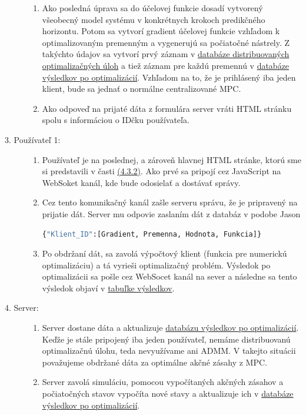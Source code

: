 \begin{description}
{\begin{enumerate}
{		}
		\item{
			 Ako posledná úprava sa do účelovej funkcie dosadí vytvorený všeobecný model systému v konkrétnych krokoch predikčného horizontu. Potom sa vytvorí gradient účelovej funkcie vzhľadom k optimalizovaným premenným a vygenerujú sa počiatočné nástrely. Z takýchto údajov sa vytvorí prvý záznam v \hyperref[DB:WORKER]{databáze distribuovaných optimalizačných úloh} a tiež záznam pre každú premennú v \hyperref[DB:WORKER_DATA]{databáze výsledkov po optimalizácií}. Vzhľadom na to, že je prihlásený iba jeden klient, bude sa jednať o normálne centralizované MPC.
		}
		\item{
			Ako odpoveď na prijaté dáta z formulára server vráti HTML stránku spolu s informáciou o IDčku používateľa.
		}
	\end{enumerate}
}
\item[3. Používateľ 1:]{\hfill
\begin{enumerate}
\item{
Používateľ je na poslednej, a zároveň hlavnej HTML stránke, ktorú sme si predstavili v časti \hyperref[subse:OPTaSIM]{(4.3.2)}. Ako prvé sa pripojí cez JavaScript na WebSoket kanál, kde bude odosielať a dostávať správy.
}
\item{
Cez tento komunikačný kanál zašle serveru správu, že je pripravený na prijatie dát. Server mu odpovie zaslaním dát z databáz v podobe Jason
\begin{lstlisting}[language=Python]
{"Klient_ID":[Gradient, Premenna, Hodnota, Funkcia]}
\end{lstlisting}
}
\item{Po obdržaní dát, sa zavolá výpočtový klient (funkcia pre numerickú optimalizáciu) a tá vyrieši optimalizačný problém. Výsledok po optimalizácii sa pošle cez WebSocet kanál na sever a následne sa tento výsledok objaví v \hyperref[fig:Tabulka]{tabuľke výsledkov}.}
\end{enumerate}
}
\item[4. Server:]{\hfill
\begin{enumerate}
\item{
Server dostane dáta a aktualizuje \hyperref[DB:WORKER_DATA]{databázu výsledkov po optimalizácií}. Keďže je stále pripojený iba jeden používateľ, nemáme distribuovanú optimalizačnú úlohu, teda nevyužívame ani ADMM. V takejto situácii považujeme obdržané dáta za optimálne akčné zásahy z MPC.
}
\item{
Server zavolá simuláciu, pomocou vypočítaných akčných zásahov a počiatočných stavov vypočíta nové stavy a aktualizuje ich v \hyperref[DB:WORKER_DATA]{databáze výsledkov po optimalizácií}.
}
\end{enumerate}}
\end{description}

